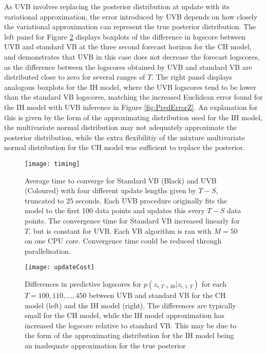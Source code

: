 \documentclass[12pt,a4paper]{article}\usepackage[]{graphicx}\usepackage[]{color}
\begin{document}
As UVB involves replacing the posterior distribution at update with its variational approximation, the error introduced by UVB depends on how closely the variational approximation can represent the true posterior distribution. The left panel for Figure \ref{fig:updateCost} displays boxplots of the difference in logscore between UVB and standard VB at the three second forecast horizon for the CH model, and demonstrates that UVB in this case does not decrease the forecast logscores, as the difference between the logscores obtained by UVB and standard VB are distributed close to zero for several ranges of $T$. The right panel displays analogous boxplots for the IH model, where the UVB logscores tend to be lower than the standard VB logscores, matching the increased Euclidean error found for the IH model with UVB inference in Figure \ref{fig:PredErrorZ}. An explanation for this is given by the form of the approximating distribution used for the IH model, the multivariate normal distribution may not adequately approximate the posterior distribution, while the extra flexibilitiy of the mixture multivariate normal distribution for the CH model was sufficient to replace the posterior.

\begin{figure}[htp]
\centering
\texttt{[image: timing]}
\caption{Average time to converge for Standard VB (Black) and UVB (Coloured) with four different update lengths given by $T - S$, truncated to 25 seconds. Each UVB procedure originally fits the model to the first 100 data points and updates this every $T - S$ data points. The convergence time for Standard VB increased linearly for $T$, but is constant for UVB. Each VB algorithm is ran with $M = 50$ on one CPU core. Convergence time could be reduced through parallelisation.}
\label{fig:timing}
\end{figure}
\begin{figure}[htp]
\centering
\texttt{[image: updateCost]}
\caption{Differences in predictive logscores for $p(z_{i, T+30} | z_{i, 1:T})$ for each $T = 100, 110, \dots, 450$ between UVB and standard VB for the CH model (left) and the IH model (right). The differences are typically small for the CH model, while the IH model approximation has increased the logscore relative to standard VB. This may be due to the form of the approximating distribution for the IH model being an inadequate approximation for the true posterior}
\label{fig:updateCost}
\end{figure}
\end{document}
